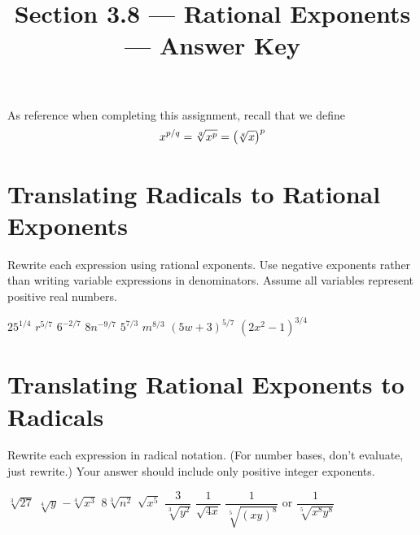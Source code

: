 

\title{Section 3.8 --- Rational Exponents --- Answer Key}


\maketitle

As reference when completing this assignment, recall that we define
$$x^{p/q}=\sqrt[q]{x^p}=\left(\sqrt[q]{x}\right)^p$$

\section*{Translating Radicals to Rational Exponents}
Rewrite each expression using rational exponents.  Use negative exponents rather than writing variable expressions in denominators.  Assume all variables represent positive real numbers.
\begin{smenum}
\mitemxxxx
{$25^{1/4}$}
{$r^{5/7}$}
{$6^{-2/7}$}
{$8n^{-9/7}$}
\mitemxxxx
{$5^{7/3}$}
{$m^{8/3}$}
{$(5w+3)^{5/7}$}
{$(2x^2-1)^{3/4}$}

\end{smenum}

\section*{Translating Rational Exponents to Radicals}
Rewrite each expression in radical notation. (For number bases, don't evaluate, just rewrite.) Your answer should include only positive integer exponents.
\begin{smenum}
\mitemxxxx
{$\sqrt[3]{27}$}
{$\sqrt[4]{y}$}
{$-\sqrt[4]{x^3}$}
{$8\sqrt[3]{n^2}$}
\mitemxxxx
{$\sqrt{x^5}$}
{$\dfrac{3}{\sqrt[3]{y^2}}$}
{$\dfrac{1}{\sqrt{4x}}$}
{$\dfrac{1}{\sqrt[5]{(xy)^8}}$ or $\dfrac{1}{\sqrt[5]{x^8y^8}}$}
\end{smenum}

